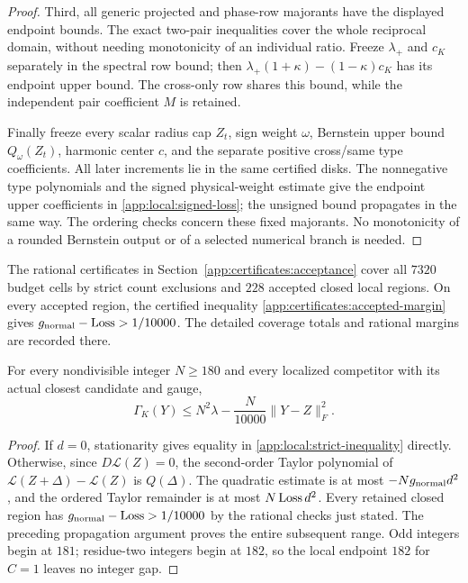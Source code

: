 \begin{proof}
Third, all generic projected and phase-row majorants have the displayed
endpoint bounds. The exact two-pair inequalities cover the whole
reciprocal domain, without needing monotonicity of an individual
ratio. Freeze $\lambda_+$ and $c_K$ separately in the spectral row
bound; then
$\lambda_+(1+\kappa)-(1-\kappa)c_K$ has its endpoint upper bound.
The cross-only row shares this bound, while the independent pair
coefficient $M$ is retained.

Finally freeze every scalar radius cap $Z_t$, sign weight $\omega$,
Bernstein upper bound $Q_\omega(Z_t)$, harmonic center $c$, and the
separate positive cross/same type coefficients. All later increments
lie in the same certified disks. The nonnegative type polynomials and
the signed physical-weight estimate give the endpoint upper
coefficients in \eqref{app:local:signed-loss}; the unsigned bound
propagates in the same way. The ordering checks concern these fixed
majorants. No monotonicity of a rounded Bernstein output or of a
selected numerical branch is needed.
\end{proof}

The rational certificates in Section~\ref{app:certificates:acceptance}
cover all $7320$ budget cells by strict count exclusions and $228$
accepted closed local regions. On every accepted region, the certified
inequality \eqref{app:certificates:accepted-margin} gives
$g_{\rm normal}-{\rm Loss}>1/10000$.
The detailed coverage totals and rational margins are recorded there.

\begin{proposition}
\label{app:local:strict}
For every nondivisible integer $N\ge180$ and every localized competitor
with its actual closest candidate and gauge,
\begin{equation}\label{app:local:strict-inequality}
 \Gamma_K(Y)\le N^2\lambda-\frac{N}{10000}\|Y-Z\|_F^2 .
\end{equation}
\end{proposition}
\begin{proof}
If $d=0$, stationarity gives equality in
\eqref{app:local:strict-inequality} directly. Otherwise, since
$D\mathcal L(Z)=0$, the second-order Taylor polynomial of
$\mathcal L(Z+\Delta)-\mathcal L(Z)$ is $Q(\Delta)$.
The quadratic estimate is at most $-Ng_{\rm normal}d^2$, and the
ordered Taylor remainder is at most $N\,{\rm Loss}\,d^2$.
Every retained closed region has
$g_{\rm normal}-{\rm Loss}>1/10000$ by the rational checks just stated.
The preceding propagation argument proves the entire subsequent
range. Odd integers begin at $181$; residue-two integers begin at
$182$, so the local endpoint $182$ for $C=1$ leaves no integer gap.
\end{proof}

